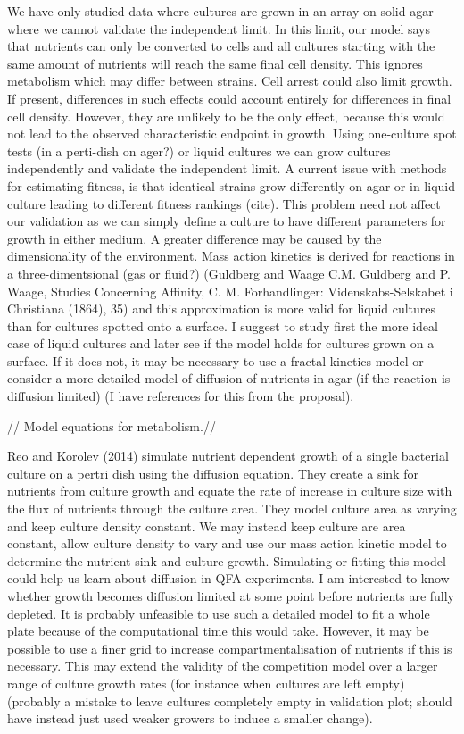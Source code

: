 We have only studied data where cultures are grown in an array on
solid agar where we cannot validate the independent limit. In this
limit, our model says that nutrients can only be converted to cells
and all cultures starting with the same amount of nutrients will reach
the same final cell density. This ignores metabolism which may differ
between strains. Cell arrest could also limit growth. If present,
differences in such effects could account entirely for differences in
final cell density. However, they are unlikely to be the only effect,
because this would not lead to the observed characteristic endpoint in
growth. Using one-culture spot tests (in a perti-dish on ager?) or
liquid cultures we can grow cultures independently and validate the
independent limit. A current issue with methods for estimating
fitness, is that identical strains grow differently on agar or in
liquid culture leading to different fitness rankings (cite). This
problem need not affect our validation as we can simply define a
culture to have different parameters for growth in either medium. A
greater difference may be caused by the dimensionality of the
environment. Mass action kinetics is derived for reactions in a
three-dimentsional (gas or fluid?) (Guldberg and Waage C.M. Guldberg
and P. Waage, Studies Concerning Affinity, C. M. Forhandlinger:
Videnskabs-Selskabet i Christiana (1864), 35) and this approximation
is more valid for liquid cultures than for cultures spotted onto a
surface. I suggest to study first the more ideal case of liquid cultures
and later see if the model holds for cultures grown on a surface. If
it does not, it may be necessary to use a fractal kinetics model or
consider a more detailed model of diffusion of nutrients in agar (if
the reaction is diffusion limited) (I have references for this from
the proposal).

// Model equations for metabolism.//

Reo and Korolev (2014) simulate nutrient dependent growth of a single
bacterial culture on a pertri dish using the diffusion equation. They
create a sink for nutrients from culture growth and equate the rate of
increase in culture size with the flux of nutrients through the
culture area. They model culture area as varying and keep culture
density constant. We may instead keep culture are area constant, allow
culture density to vary and use our mass action kinetic model to
determine the nutrient sink and culture growth. Simulating or fitting
this model could help us learn about diffusion in QFA experiments. I
am interested to know whether growth becomes diffusion limited at some
point before nutrients are fully depleted. It is probably unfeasible
to use such a detailed model to fit a whole plate because of the
computational time this would take. However, it may be possible to use
a finer grid to increase compartmentalisation of nutrients if this is
necessary. This may extend the validity of the competition model over
a larger range of culture growth rates (for instance when cultures are
left empty) (probably a mistake to leave cultures completely empty in
validation plot; should have instead just used weaker growers to
induce a smaller change).



